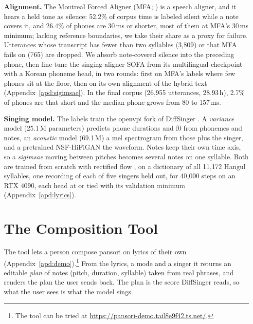 \documentclass[wcp]{jmlr}
\begin{document}
\textbf{Alignment.} The Montreal Forced Aligner (MFA; \citealp{mcauliffe2017mfa}) is a speech aligner,
and it hears a held tone as silence: 52.2\% of corpus time is labeled silent while a note
covers it, and 26.4\% of phones are 30\,ms or shorter, most of them at MFA's 30\,ms
minimum; lacking reference boundaries, we take their share as a proxy
for failure. Utterances whose transcript has fewer than two syllables (3,809) or that MFA
fails on (765) are dropped. We absorb note-covered silence into the preceding phone, then
fine-tune the singing aligner SOFA \citep{sofa} from its multilingual checkpoint with
a Korean phoneme head, in two rounds: first on MFA's labels where few phones sit at the
floor, then on its own alignment of the hybrid text (Appendix~\ref{apd:sigimsae}). In the
final corpus (26,955 utterances, 28.93\,h), 2.7\% of phones are that short and
the median phone grows from 80 to 157\,ms.

\textbf{Singing model.} The labels train the openvpi fork \citep{openvpi} of DiffSinger
\citep{liu2022diffsinger}. A \emph{variance} model (25.1\,M parameters) predicts phone
durations and f0 from phonemes and notes, an \emph{acoustic} model (69.1\,M) a mel
spectrogram from those plus the singer, and a pretrained NSF-HiFiGAN
\citep{openvpivocoders} the waveform. Notes keep their own time axis, so a \emph{sigimsae}
moving between pitches becomes several notes on one syllable. Both are trained from
scratch with rectified flow \citep{liu2023flow}, on a dictionary of all 11,172 Hangul
syllables, one recording of each of five singers held out, for 40,000 steps on an
RTX 4090, each head at or tied with its validation minimum (Appendix~\ref{apd:lyrics}).

\section{The Composition Tool}\label{sec:tool}
The tool lets a person compose pansori on lyrics of their own
(Appendix~\ref{apd:demo}).\footnote{The tool can be tried at \url{https://pansori-demo.tail8e9f42.ts.net/}.}
From the lyrics, a mode and a singer it returns an editable \emph{plan} of notes (pitch,
duration, syllable) taken from real phrases, and renders the plan the user sends back. The plan is the score DiffSinger reads, so what the user sees is what the model sings.
\end{document}
